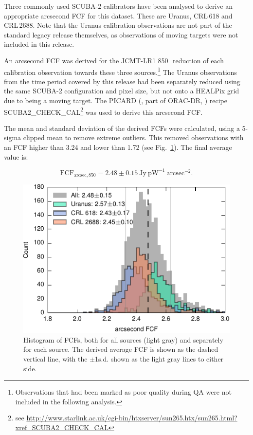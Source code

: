 \documentclass[twocolumn]{aastex6}
\newcommand{\ascl}[1]{\href{http://www.ascl.net/#1}{ascl:#1}}
\begin{document}
Three commonly used SCUBA-2 calibrators have been analysed to derive
an appropriate arcsecond FCF for this dataset. These are Uranus,
CRL\,618 and CRL\,2688. Note that the Uranus calibration observations
are not part of the standard legacy release themselves, as
observations of moving targets were not included in this release.

An arcsecond FCF was derived for the JCMT-LR1 850\,\micron\ reduction
of each calibration observation towards these three
sources.\footnote{Observations that had been marked as poor quality
  during QA were not included in the following analysis.}  The Uranus
observations from the time period covered by this release had been
separately reduced using the same SCUBA-2 configuration and pixel
size, but not onto a HEALPix grid due to being a moving target. The
PICARD (\citealp{SUN265}, part of ORAC-DR, \citealp[][\ascl{1310.001}]{SUN230})
recipe SCUBA2\_CHECK\_CAL\footnote{see
  \url{http://www.starlink.ac.uk/cgi-bin/htxserver/sun265.htx/sun265.html?xref_SCUBA2_CHECK_CAL}}
was used to derive this arcsecond FCF.

The mean and standard deviation of the derived FCFs were calculated,
using a 5-sigma clipped mean to remove extreme outliers. This removed
observations with an FCF higher than 3.24 and lower than 1.72 (see
Fig.~\ref{fig:calibhist}). The final average value is:

\begin{equation}
\mathrm{FCF}_{\mathrm{arcsec},850} = 2.48 \pm 0.15\ \mathrm{Jy}\ \mathrm{pW}^{-1}\  \mathrm{arcsec}^{-2}.
\end{equation}

\begin{figure}
  \centering
  \includegraphics{lrvalues-histo}
  \caption{Histogram of FCFs, both for all sources (light gray) and
    separately for each source. The derived average FCF is shown as
    the dashed vertical line, with the $\pm$1s.d. shown as the light
    gray lines to either side.}
  \label{fig:calibhist}
\end{figure}
\end{document}
